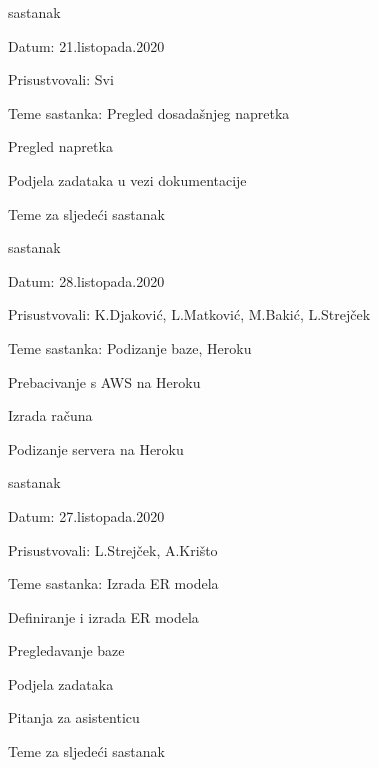\begin{packed_enum}
			
			
			\item  sastanak
			\item[] \begin{packed_item}
				\item Datum: 21.listopada.2020
				\item Prisustvovali: Svi
				\item Teme sastanka: Pregled dosadašnjeg napretka
				\begin{packed_item}
				    \item Pregled napretka
					\item Podjela zadataka u vezi dokumentacije
					\item Teme za sljedeći sastanak
				\end{packed_item}
			\end{packed_item}
			
			
			\item  sastanak
			\item[] \begin{packed_item}
				\item Datum: 28.listopada.2020
				\item Prisustvovali: K.Djaković, L.Matković, M.Bakić, L.Strejček
				\item Teme sastanka: Podizanje baze, Heroku
				\begin{packed_item}
				    \item Prebacivanje s AWS na Heroku
					\item Izrada računa
					\item Podizanje servera na Heroku
				\end{packed_item}
			\end{packed_item}
			
			\item  sastanak
			\item[] \begin{packed_item}
				\item Datum: 27.listopada.2020
				\item Prisustvovali: L.Strejček, A.Krišto
				\item Teme sastanka: Izrada ER modela
				\begin{packed_item}
				    \item Definiranje i izrada ER modela
					\item Pregledavanje baze
					\item Podjela zadataka
					\item Pitanja za asistenticu
					\item Teme za sljedeći sastanak
				\end{packed_item}
			\end{packed_item}
			

\end{packed_enum}
